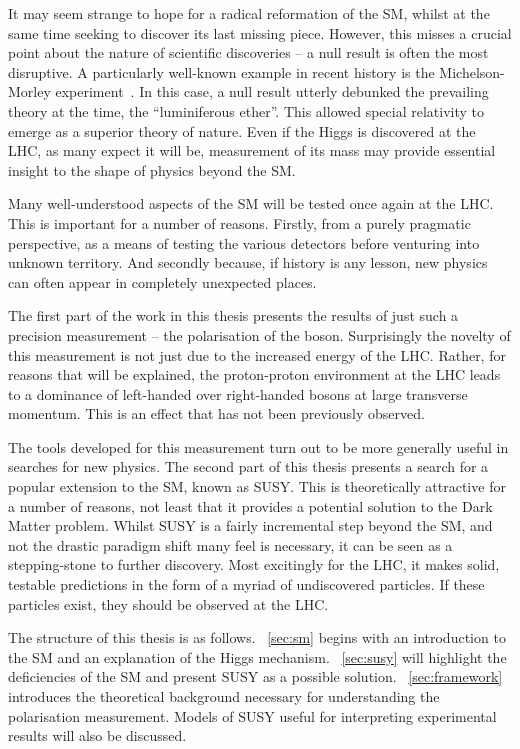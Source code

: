 It may seem strange to hope for a radical reformation of the \ac{SM}, whilst at
the same time seeking to discover its last missing piece. However, this misses a
crucial point about the nature of scientific discoveries -- a null result is
often the most disruptive. A particularly well-known example in recent history
is the Michelson-Morley experiment~\cite{michelson_morley}. In this case, a null result utterly debunked
the prevailing theory at the time, the ``luminiferous ether''. This allowed
special relativity to emerge as a superior theory of nature. Even if the Higgs
is discovered at the \ac{LHC}, as many expect it will be, measurement of its
mass may provide essential insight to the shape of physics beyond the \ac{SM}.

Many well-understood aspects of the \ac{SM} will be tested once again at the
\ac{LHC}. This is important for a number of reasons. Firstly, from a purely
pragmatic perspective, as a means of testing the various detectors before
venturing into unknown territory. And secondly because, if history is any
lesson, new physics can often appear in completely unexpected places.

The first part of the work in this thesis presents the results of just such a
precision measurement -- the polarisation of the \PW boson. Surprisingly the
novelty of this measurement is not just due to the increased energy of the
\ac{LHC}. Rather, for reasons that will be explained, the proton-proton
environment at the \ac{LHC} leads to a dominance of left-handed over
right-handed \PW bosons at large transverse momentum. This is an effect that has
not been previously observed.

The tools developed for this measurement turn out to be more generally useful in
searches for new physics. The second part of this thesis presents a search for a
popular extension to the \ac{SM}, known as \acf{SUSY}. This is theoretically
attractive for a number of reasons, not least that it provides a potential
solution to the Dark Matter problem. Whilst \ac{SUSY} is a fairly incremental
step beyond the \ac{SM}, and not the drastic paradigm shift many feel is
necessary, it can be seen as a stepping-stone to further discovery. Most
excitingly for the \ac{LHC}, it makes solid, testable predictions in the form of
a myriad of undiscovered particles. If these particles exist, they should be
observed at the \ac{LHC}.

The structure of this thesis is as follows. \chap~\ref{sec:sm} begins with an
introduction to the \ac{SM} and an explanation of the Higgs
mechanism. \chap~\ref{sec:susy} will highlight the deficiencies of the \ac{SM}
and present \ac{SUSY} as a possible solution. \chap~\ref{sec:framework}
introduces the theoretical background necessary for understanding the \PW
polarisation measurement. Models of \ac{SUSY} useful for interpreting
experimental results will also be discussed.

